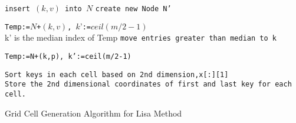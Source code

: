 \begin{algorithm}[H]
    \SetAlgoLined
     {
        \texttt{insert $(k,v)$ into $N$}
     }
     {
        \texttt{create new Node N'}
     }
    {
    
        \texttt{Temp:=$N$+$(k,v)$, $k’$:=$ceil(m/2-1)$} \\k' is the median index of Temp
        \texttt{move entries greater than median to k}
        
    }
    {
        \texttt{Temp:=N+(k,p), k’:=ceil(m/2-1)}
     
    }
    
    
     
     \texttt{Sort keys in each cell based on 2nd dimension,x[:][1] }\\
     
      {
         {
            \texttt{Store the 2nd dimensional coordinates of first and last key for each cell.} \\
		 }
      }
     \caption{Grid Cell Generation Algorithm for Lisa Method}
     \label{Training_Lisa_Baseline}
\end{algorithm}
